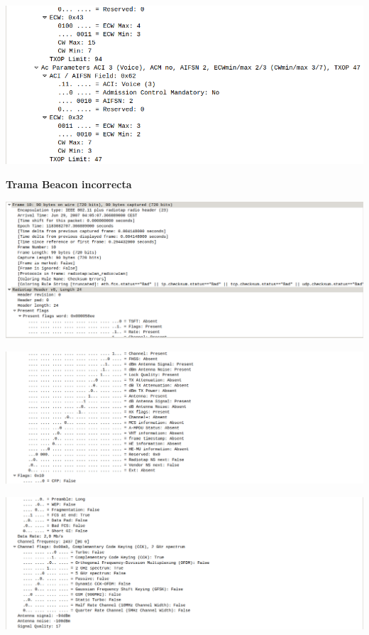 \documentclass{article}
\begin{document}
\begin{center}
\includegraphics[scale=0.3]{WLAN/correcto12.png}
\end{center}

\textbf{Trama Beacon incorrecta}

\begin{center}
\includegraphics[scale=0.3]{WLAN/inco1.png}
\end{center}
\begin{center}
\includegraphics[scale=0.3]{WLAN/inco2.png}
\end{center}
\begin{center}
\includegraphics[scale=0.3]{WLAN/inco3.png}
\end{center}
\end{document}
